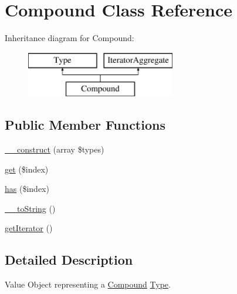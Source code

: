 \hypertarget{classphp_documentor_1_1_reflection_1_1_types_1_1_compound}{}\section{Compound Class Reference}
\label{classphp_documentor_1_1_reflection_1_1_types_1_1_compound}
Inheritance diagram for Compound\+:\begin{figure}[H]
\begin{center}
\leavevmode
\includegraphics[height=2.000000cm]{classphp_documentor_1_1_reflection_1_1_types_1_1_compound}
\end{center}
\end{figure}
\subsection*{Public Member Functions}
\begin{DoxyCompactItemize}
\item 
\mbox{\hyperlink{classphp_documentor_1_1_reflection_1_1_types_1_1_compound_a66c0bd71b182b3e6d120705f4e011f0c}{\+\_\+\+\_\+construct}} (array \$types)
\item 
\mbox{\hyperlink{classphp_documentor_1_1_reflection_1_1_types_1_1_compound_a83366960f81b1627f37353da9768c264}{get}} (\$index)
\item 
\mbox{\hyperlink{classphp_documentor_1_1_reflection_1_1_types_1_1_compound_a709fab8b3056d23e5cf2be3d5c6eda21}{has}} (\$index)
\item 
\mbox{\hyperlink{classphp_documentor_1_1_reflection_1_1_types_1_1_compound_a7516ca30af0db3cdbf9a7739b48ce91d}{\+\_\+\+\_\+to\+String}} ()
\item 
\mbox{\hyperlink{classphp_documentor_1_1_reflection_1_1_types_1_1_compound_a7a9f937c2958e6f4dd7b030f86fb70b7}{get\+Iterator}} ()
\end{DoxyCompactItemize}


\subsection{Detailed Description}
Value Object representing a \mbox{\hyperlink{classphp_documentor_1_1_reflection_1_1_types_1_1_compound}{Compound}} \mbox{\hyperlink{interfacephp_documentor_1_1_reflection_1_1_type}{Type}}.

